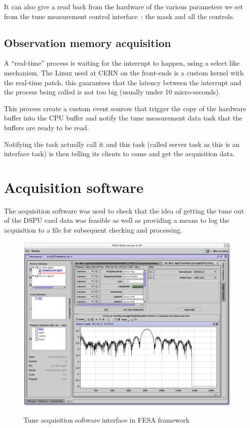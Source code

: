 It can also give a read back from the hardware of the various parameters we set from the tune measurement control interface~: the mask and all the controls.

\subsection{Observation memory acquisition}
\label{sec:obs_mem_acq}

A ``real-time'' process is waiting for the interrupt to happen, using a select like mechanism. The Linux used at \gls{CERN} on the front-ends is a custom kernel with the real-time patch, this guarantees that the latency between the interrupt and the process being called is not too big (usually under 10 micro-seconds).

This process create a custom event sources that trigger the copy of the hardware buffer into the \gls{CPU} buffer and notify the tune measurement data task that the buffers are ready to be read.

Notifying the task actually call it and this task (called server task as this is an interface task) is then telling its clients to come and get the acquisition data. 

\section{Acquisition software}

The acquisition software was used to check that the idea of getting the tune out of the DSPU card data was feasible as well as providing a means to log the acquisition to a file for subsequent checking and processing.

\begin{figure}[H]
\caption{Tune acquisition software interface in FESA framework}
\centering
\includegraphics[scale=0.25]{amplitude_log.pdf}
\label{fig:tuneacq}
\end{figure}

